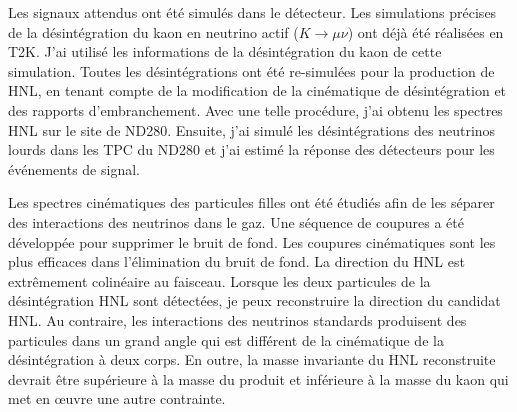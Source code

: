 \documentclass[../main.tex]{subfiles}
\begin{document}
Les signaux attendus ont été simulés dans le détecteur. Les simulations précises de la désintégration du kaon en neutrino actif ($K\to\mu\nu$) ont déjà été réalisées en T2K. J'ai utilisé les informations de la désintégration du kaon de cette simulation. Toutes les désintégrations ont été re-simulées pour la production de HNL, en tenant compte de la modification de la cinématique de désintégration et des rapports d'embranchement. Avec une telle procédure, j'ai obtenu les spectres HNL sur le site de ND280. Ensuite, j'ai simulé les désintégrations des neutrinos lourds dans les TPC du ND280 et j'ai estimé la réponse des détecteurs pour les événements de signal.


Les spectres cinématiques des particules filles ont été étudiés afin de les séparer des interactions des neutrinos dans le gaz. Une séquence de coupures a été développée pour supprimer le bruit de fond. Les coupures cinématiques sont les plus efficaces dans l'élimination du bruit de fond. La direction du HNL est extrêmement colinéaire au faisceau. Lorsque les deux particules de la désintégration HNL sont détectées, je peux reconstruire la direction du candidat HNL. Au contraire, les interactions des neutrinos standards produisent des particules dans un grand angle qui est différent de la cinématique de la désintégration à deux corps. En outre, la masse invariante du HNL reconstruite devrait être supérieure à la masse du produit et inférieure à la masse du kaon qui met en œuvre une autre contrainte.


\end{document}
